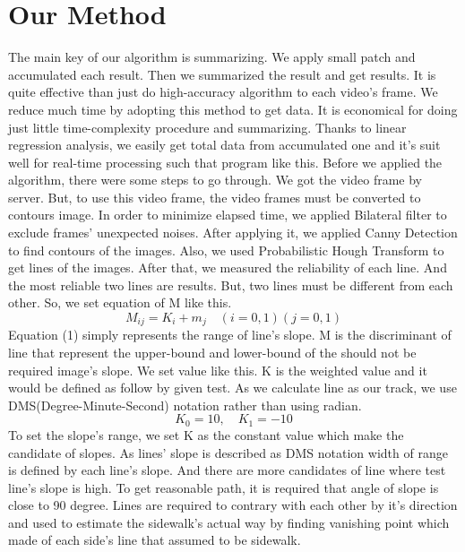 \section{Our Method}
\label{sec:ourmethod}
The main key of our algorithm is summarizing. We apply small patch and accumulated each result. Then we summarized the result and get results. It is quite effective than just do high-accuracy algorithm to each video's frame. We reduce much time by adopting this method to get data. It is economical for doing just little time-complexity procedure and summarizing. Thanks to linear regression analysis, we easily get total data from accumulated one and it's suit well for real-time processing such that program like this.
\newline\newline 
Before we applied the algorithm, there were some steps to go through. We got the video frame by server. But, to use this video frame, the video frames must be converted to contours image. In order to minimize elapsed time, we applied Bilateral filter to exclude frames' unexpected noises. After applying it, we applied Canny Detection to find contours of the images. Also, we used Probabilistic Hough Transform to get lines of the images. After that, we measured the reliability of each line. And the most reliable two lines are results. But, two lines must be different from each other. So, we set equation of M like this.
\begin{equation}
\mathit{{M}_{ij} = {K}_{i} + {m}_{j}} \quad\left(i=0,1 \right) \left(j=0,1 \right)
\end{equation}
Equation (1) simply represents the range of line's slope. M is the discriminant of line that represent the upper-bound and lower-bound of the should not be required image's slope. We set value like this. K is the weighted value and it would be defined as follow by given test. As we calculate line as our track, we use DMS(Degree-Minute-Second) notation rather than using radian.
\begin{equation}{K}_{0} = 10,\quad{K}_{1} = -10\end{equation} 
To set the slope's range, we set K as the constant value which make the candidate of slopes. As lines' slope is described as DMS notation width of range is defined by each line's slope. And there are more candidates of line where test line's slope is high. To get reasonable path, it is required that angle of slope is close to 90 degree. Lines are required to contrary with each other by it's direction and used to estimate the sidewalk's actual way by finding vanishing point which made of each side's line that assumed to be sidewalk. 


